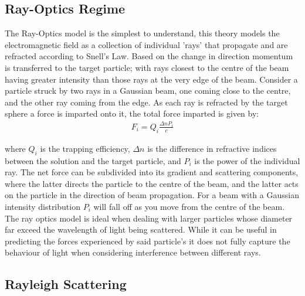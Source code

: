 \subsection{Ray-Optics Regime}

The Ray-Optics model is the simplest to understand, this theory models 
the electromagnetic field as a collection of individual 'rays' that 
propagate and are refracted according to Snell's Law. Based on the 
change in direction momentum is transferred to the target particle; 
with rays closest to the centre of the beam having greater intensity 
than those rays at the very edge of the beam. Consider a particle 
struck by two rays in a Gaussian beam, one coming close to the centre, 
and the other ray coming from the edge. As each ray is refracted by 
the target sphere a force is imparted onto it, the total force 
imparted is given by:
\begin{align}
	F_i = Q_i\frac{\Delta n P_i}{c}
\end{align}

\noindent 
where $Q_i$ is the trapping efficiency, $\Delta n$ is the difference
in refractive indices between the solution and the target particle,
and $P_i$ is the power of the individual ray. The net force can be 
subdivided into its gradient and scattering components, where the latter
directs the particle to the centre of the beam, and the latter acts on 
the particle in the direction of beam propagation. For a beam with a
Gaussian intensity distribution $P_i$ will fall off as you move from
the centre of the beam. The ray optics model is ideal when dealing 
with larger particles whose diameter far exceed the wavelength of light
being scattered. While it can be useful in predicting the forces 
experienced by said particle's it does not fully capture the behaviour
of light when considering interference between different rays.

\subsection{Rayleigh Scattering}

